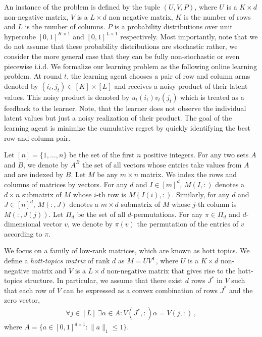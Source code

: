 
\newcommand{\transpose}{^\mathsf{\scriptscriptstyle T}}

An instance of the problem is defined by the tuple $(U,V,P)$, where $U$ is a $K\times d$ non-negative matrix, $V$ is a $L\times d$ non negative matrix, $K$ is the number of rows and $L$ is the number of columns. $P$ is a probability distributions over unit hypercube $[0,1]^{K\times 1}$ and $[0,1]^{L\times 1}$ respectively. Most importantly, note that we do not assume that these probability distributions are stochastic rather, we consider the more general case that they can be fully non-stochastic or even piecewise i.i.d. We formalize our learning problem as the following online learning problem. At round $t$, the learning agent chooses a pair of row and column arms denoted by $(i_t, j_t) \in [K]\times [L]$ and receives a noisy product of their latent values. This noisy product is denoted by $u_t(i_t)v_t(j_t)$ which is treated as a feedback to the learner. Note, that the learner does not observe the individual latent values but just a noisy realization of their product. The goal of the learning agent is minimize the cumulative regret by quickly identifying the best row and column pair.

Let $[n] = \{1, \dots, n\}$ be the set of the first $n$ positive integers. For any two sets $A$ and $B$, we denote by $A^B$ the set of all vectors whose entries take values from $A$ and are indexed by $B$. Let $M$ be any $m \times n$ matrix. We index the rows and columns of matrices by vectors. For any $d$ and $I \in [m]^d$, $M(I, :)$ denotes a $d \times n$ submatrix of $M$ whose $i$-th row is $M(I(i), :)$. Similarly, for any $d$ and $J \in [n]^d$, $M(:, J)$ denotes a $m \times d$ submatrix of $M$ whose $j$-th column is $M(:, J(j))$. Let $\Pi_d$ be the set of all $d$-permutations. For any $\pi \in \Pi_d$ and $d$-dimensional vector $v$, we denote by $\pi(v)$ the permutation of the entries of $v$ according to $\pi$.

We focus on a family of low-rank matrices, which are known as hott topics. We define a \emph{hott-topics matrix} of rank $d$ as $M = U V\transpose$, where $U$ is a $K \times d$ non-negative matrix and $V$ is a $L \times d$ non-negative matrix that gives rise to the hott-topics structure. In particular, we assume that there exist $d$ rows $J^\ast$ in $V$ such that each row of $V$ can be expressed as a convex combination of rows $J^\ast$ and the zero vector,
\begin{align}
  \forall j \in [L] \ \exists \alpha \in A: V(J^\ast, :) \alpha = V(j, :)\,,
  \label{eq:hott topics}
\end{align}
where $A = \{a \in [0, 1]^{d \times 1}: \|a\|_1 \leq 1\}$.

